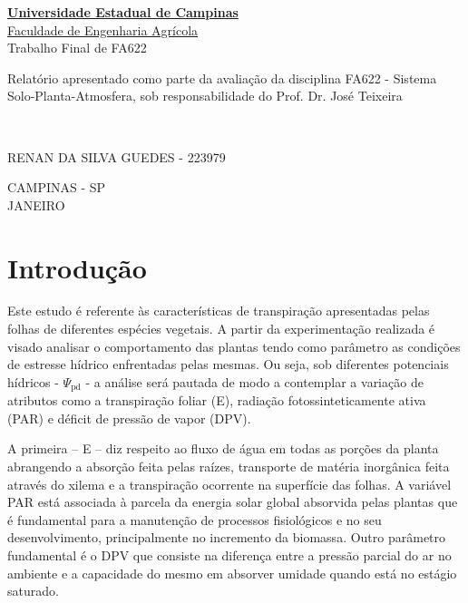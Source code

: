 \documentclass[a4paper, 12pt]{article}
\begin{document}
	\begin{titlepage}
		\begin{center}
			\textbf{\href{https://www.unicamp.br/unicamp/}{Universidade Estadual de Campinas}}\\\vspace{1cm}
			\href{https://www.feagri.unicamp.br/portal/}{Faculdade de Engenharia Agrícola}\\\vspace{5cm}
			\large{Trabalho Final de FA622}\\\vspace{4cm}
		\end{center}
		
		\hspace{8cm}\parbox{7cm}{Relatório apresentado como parte da avaliação da disciplina FA622 - Sistema Solo-Planta-Atmosfera, sob responsabilidade do Prof. Dr. José Teixeira}\\\vspace{4cm}
		
		RENAN DA SILVA GUEDES - 223979\\\vspace{4cm}
		\begin{center}
			CAMPINAS - SP\\\vspace{.2cm}
			JANEIRO
		\end{center}
		
	\end{titlepage}
	
	\newpage
	
	\section{Introdução}

	Este estudo é referente às características de transpiração apresentadas pelas folhas de diferentes espécies vegetais. A partir da experimentação realizada é visado analisar o comportamento das plantas tendo como parâmetro as condições de estresse hídrico enfrentadas pelas mesmas. Ou seja, sob diferentes potenciais hídricos - $\Psi_{\textrm{pd}}$ - a análise será pautada de modo a contemplar a variação de atributos como a transpiração foliar (E), radiação fotossinteticamente ativa (PAR) e déficit de pressão de vapor (DPV). 
	
	A primeira -- E -- diz respeito ao fluxo de água em todas as porções da planta abrangendo a absorção feita pelas raízes, transporte de matéria inorgânica feita através do xilema e a transpiração ocorrente na superfície das folhas. A variável PAR está associada à parcela da energia solar global absorvida pelas plantas que é fundamental para a manutenção de processos fisiológicos e no seu desenvolvimento, principalmente no incremento da biomassa.
	Outro parâmetro fundamental é o DPV que consiste na diferença entre a pressão parcial do ar no ambiente e a capacidade do mesmo em absorver umidade quando está no estágio saturado.
\end{document}
